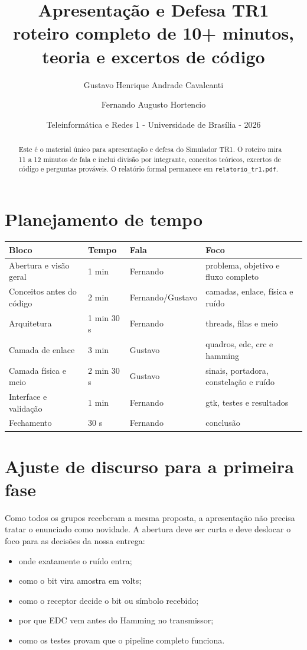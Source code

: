 \documentclass[10pt,a4paper]{article}
\title{\vspace{-1.1cm}\textbf{Apresentação e Defesa TR1}\\
\large roteiro completo de 10+ minutos, teoria e excertos de código}
\author{Gustavo Henrique Andrade Cavalcanti \and Fernando Augusto Hortencio}
\date{Teleinformática e Redes 1 - Universidade de Brasília - 2026}
\begin{document}
\maketitle
\vspace{-0.55cm}

\begin{abstract}
Este é o material único para apresentação e defesa do Simulador TR1. O
roteiro mira 11 a 12 minutos de fala e inclui divisão por integrante,
conceitos teóricos, excertos de código e perguntas prováveis. O relatório
formal permanece em \texttt{relatorio\_tr1.pdf}.
\end{abstract}

\section{Planejamento de tempo}

\begin{tabular}{p{4.1cm}p{1.8cm}p{3.1cm}p{5.5cm}}
\toprule
\textbf{Bloco} & \textbf{Tempo} & \textbf{Fala} & \textbf{Foco} \\
\midrule
Abertura e visão geral & 1 min & Fernando & problema, objetivo e fluxo completo \\
Conceitos antes do código & 2 min & Fernando/Gustavo & camadas, enlace, física e ruído \\
Arquitetura & 1 min 30 s & Fernando & threads, filas e meio \\
Camada de enlace & 3 min & Gustavo & quadros, edc, crc e hamming \\
Camada física e meio & 2 min 30 s & Gustavo & sinais, portadora, constelação e ruído \\
Interface e validação & 1 min & Fernando & gtk, testes e resultados \\
Fechamento & 30 s & Fernando & conclusão \\
\bottomrule
\end{tabular}

\section{Ajuste de discurso para a primeira fase}

Como todos os grupos receberam a mesma proposta, a apresentação não precisa
tratar o enunciado como novidade. A abertura deve ser curta e deve deslocar o
foco para as decisões da nossa entrega:

\begin{itemize}
  \item onde exatamente o ruído entra;
  \item como o bit vira amostra em volts;
  \item como o receptor decide o bit ou símbolo recebido;
  \item por que EDC vem antes do Hamming no transmissor;
  \item como os testes provam que o pipeline completo funciona.
\end{itemize}
\end{document}
